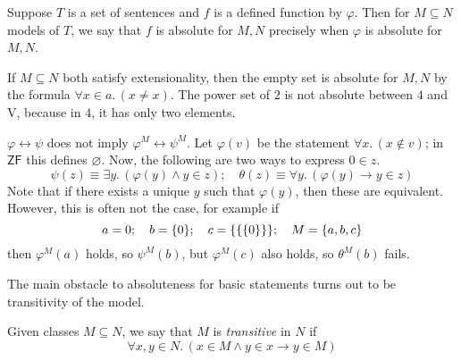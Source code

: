 Suppose \( T \) is a set of sentences and \( f \) is a defined function by \( \varphi \).
Then for \( M \subseteq N \) models of \( T \), we say that \( f \) is absolute for \( M, N \) precisely when \( \varphi \) is absolute for \( M, N \).
\begin{example}
    If \( M \subseteq N \) both satisfy extensionality, then the empty set is absolute for \( M, N \) by the formula \( \forall x \in a.\, (x \neq x) \).
    The power set of \( 2 \) is not absolute between \( 4 \) and \( \mathrm{V} \), because in \( 4 \), it has only two elements.
\end{example}
\begin{example}
    \( \varphi \leftrightarrow \psi \) does not imply \( \varphi^M \leftrightarrow \psi^M \).
    Let \( \varphi(v) \) be the statement \( \forall x.\, (x \notin v) \); in \( \mathsf{ZF} \) this defines \( \varnothing \).
    Now, the following are two ways to express \( 0 \in z \).
    \[ \psi(z) \equiv \exists y.\, (\varphi(y) \wedge y \in z);\quad \theta(z) \equiv \forall y.\, (\varphi(y) \to y \in z) \]
    Note that if there exists a unique \( y \) such that \( \varphi(y) \), then these are equivalent.
    However, this is often not the case, for example if
    \[ a = 0;\quad b = \qty{0};\quad c = \qty{\qty{\qty{0}}};\quad M = \qty{a, b, c} \]
    then \( \varphi^M(a) \) holds, so \( \psi^M(b) \), but \( \varphi^M(c) \) also holds, so \( \theta^M(b) \) fails.
\end{example}
The main obstacle to absoluteness for basic statements turns out to be transitivity of the model.
\begin{definition}
    Given classes \( M \subseteq N \), we say that \( M \) is \emph{transitive} in \( N \) if
    \[ \forall x, y \in N.\, (x \in M \wedge y \in x \to y \in M) \]
\end{definition}

